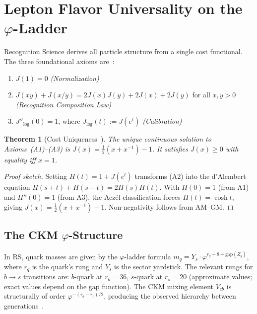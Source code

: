 \documentclass[12pt,a4paper]{article}
\newtheorem{theorem}{Theorem}[section]
\theoremstyle{definition}
\theoremstyle{remark}
\begin{document}
\section{Lepton Flavor Universality on the $\varphi$-Ladder}
\label{sec:lfu}

Recognition Science derives all particle structure from a single cost functional.
The three foundational axioms are~\cite{RS_Axioms}:
\begin{enumerate}[label=(A\arabic*),nosep]
  \item $J(1) = 0$ \hfill \textit{(Normalization)}
  \item $J(xy) + J(x/y) = 2J(x)J(y) + 2J(x) + 2J(y)$ for all $x, y > 0$
  \hfill \textit{(Recognition Composition Law)}
  \item $J''_{\log}(0) = 1$, where $J_{\log}(t) := J(e^t)$
  \hfill \textit{(Calibration)}
\end{enumerate}

\begin{theorem}[Cost Uniqueness~\cite{RS_Axioms}]
\label{thm:J}
The unique continuous solution to Axioms~(A1)--(A3) is
$J(x) = \tfrac{1}{2}(x + x^{-1}) - 1$.  It satisfies $J(x) \geq 0$
with equality iff $x = 1$.
\end{theorem}

\begin{proof}[Proof sketch]
Setting $H(t) = 1 + J(e^t)$ transforms (A2) into the d'Alembert equation
$H(s{+}t) + H(s{-}t) = 2H(s)H(t)$.  With $H(0) = 1$ (from A1) and
$H''(0) = 1$ (from A3), the Acz\'el classification forces $H(t) = \cosh t$,
giving $J(x) = \tfrac{1}{2}(x+x^{-1}) - 1$.  Non-negativity follows from
AM--GM.
\end{proof}

\subsection*{The CKM $\varphi$-Structure}

In RS, quark masses are given by the $\varphi$-ladder formula
$m_q = Y_s \cdot \varphi^{r_q - 8 + \mathrm{gap}(Z_q)}$, where $r_q$
is the quark's rung and $Y_s$ is the sector yardstick.  The relevant
rungs for $b \to s$ transitions are: $b$-quark at $r_b = 36$,
$s$-quark at $r_s = 20$ (approximate values; exact values depend on the
gap function).  The CKM mixing element $V_{cb}$ is structurally of order
$\varphi^{-(r_b - r_c)/2}$, producing the observed hierarchy between
generations~\cite{RS_Axioms}.
\end{document}
